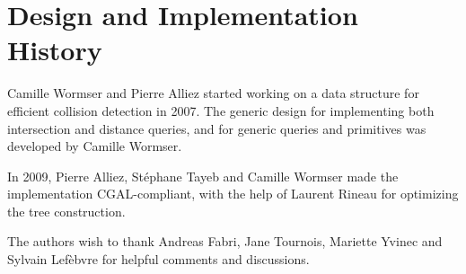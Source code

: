 \section{Design and Implementation History}
\label{AABB_tree_section_history}

Camille Wormser and Pierre Alliez started working on a data structure for efficient collision detection in 2007. The generic design for implementing both intersection and distance queries, and for generic queries and primitives was developed by Camille Wormser.

In 2009, Pierre Alliez, St\'ephane Tayeb and Camille Wormser made the implementation CGAL-compliant, with the help of Laurent Rineau for optimizing the tree construction.

The authors wish to thank Andreas Fabri, Jane Tournois, Mariette Yvinec and Sylvain Lef\`ebvre for helpful comments and discussions.
